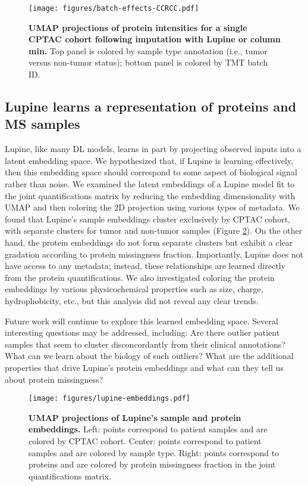 \documentclass{article}
\begin{document}
\begin{figure}
  \centering
  \texttt{[image: figures/batch-effects-CCRCC.pdf]}
  \caption{{\bf UMAP projections of protein intensities for a single CPTAC cohort following imputation with Lupine or column min.}  
  Top panel is colored by sample type annotation (i.e., tumor versus non-tumor status); bottom panel is colored by TMT batch ID.}
  \label{fig:batch-effects}
\end{figure} 

\subsection{Lupine learns a representation of proteins and MS samples}

Lupine, like many DL models, learns in part by projecting observed inputs into a latent embedding space. We hypothesized that, if Lupine is learning effectively, then this embedding space should correspond to some aspect of biological signal rather than noise. We examined the latent embeddings of a Lupine model fit to the joint quantifications matrix by reducing the embedding dimensionality with UMAP and then coloring the 2D projection using various types of metadata. We found that Lupine's sample embeddings cluster exclusively by CPTAC cohort, with separate clusters for tumor and non-tumor samples (Figure \ref{fig:embeddings}). On the other hand, the protein embeddings do not form separate clusters but exhibit a clear gradation according to protein missingness fraction. Importantly, Lupine does not have access to any metadata; instead, these relationships are learned directly from the protein quantifications. We also investigated coloring the protein embeddings by various physicochemical properties such as size, charge, hydrophobicity, etc., but this analysis did not reveal any clear trends.

Future work will continue to explore this learned embedding space. Several interesting questions may be addressed, including: Are there outlier patient samples that seem to cluster disconcordantly from their clinical annotations? What can we learn about the biology of such outliers? What are the additional properties that drive Lupine’s protein embeddings and what can they tell us about protein missingness?  

\begin{figure}
  \centering
  \texttt{[image: figures/lupine-embeddings.pdf]}
  \caption{{\bf UMAP projections of Lupine's sample and protein embeddings.} Left: points correspond to patient samples and are colored by CPTAC cohort. Center: points correspond to patient samples and are colored by sample type. Right: points correspond to proteins and are colored by protein missingness fraction in the joint quantifications matrix.}
  \label{fig:embeddings}
\end{figure} 
\end{document}
